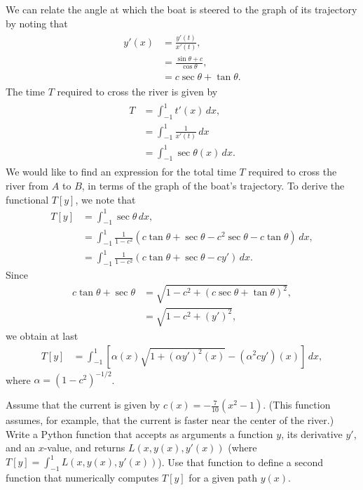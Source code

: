 We can relate the angle at which the boat is steered to the graph of its trajectory by noting that 
\begin{align}
\begin{split}
	y'(x) &= \frac{y'(t)}{x'(t)} ,\\
	&= \frac{\sin \theta + c}{\cos \theta},\\
	&= c\sec \theta + \tan \theta .%
\end{split} \label{rivercrossing:angle}
\end{align}
The time $T$ required to cross the river is given by
\begin{align}
\begin{split}
	T &= \int_{-1}^1 t'(x)\, dx, \\
	&= \int_{-1}^1 \frac{1}{x'(t)}\, dx \\ 
	&= \int_{-1}^1 \sec \theta (x)\, dx. 
\end{split}\label{rivercrossing:T}
\end{align}
We would like to find an expression for the total time $T$ required to cross the river from $A$ to $B$, in terms of the graph of the boat's trajectory. 
To derive the functional $T[y]$, we note that 
\begin{align*}
	T[y] &= \int_{-1}^1 \sec \theta\, dx,\\
	&= \int_{-1}^1 \frac{1}{1-c^2}(c \tan \theta + \sec \theta -c^2 \sec \theta - c\tan \theta)\, dx, \\
	&= \int_{-1}^1 \frac{1}{1-c^2}(c \tan \theta + \sec \theta -c y' )\, dx.	
\end{align*}
Since 
\begin{align*}
	c\tan \theta + \sec \theta &= \sqrt{1 - c^2 + (c \sec \theta + \tan \theta)^2},\\
	&= \sqrt{1 - c^2 + (y')^2},
\end{align*}
we obtain at last
\begin{align}
	T[y] &= \int_{-1}^1 \left[ \alpha(x)\sqrt{1 + (\alpha y')^2(x)} - (\alpha^2 c y')(x) \right]\, dx,
\end{align}
where $\alpha = (1 - c^2)^{-1/2}$.

\begin{problem}
Assume that the current is given by $c(x) = -\frac{7}{10}(x^2-1)$. (This function assumes, for example, that the current is faster near the center of the river.)
Write a Python function that accepts as arguments a function $y$, its derivative $y'$, and an $x$-value, and returns $L(x,y(x),y'(x))$ (where $T[y] = \int_{-1}^1 L(x,y(x),y'(x))$). Use that function to define a second function that numerically computes $T[y]$ for a given path $y(x)$. 
\end{problem}

